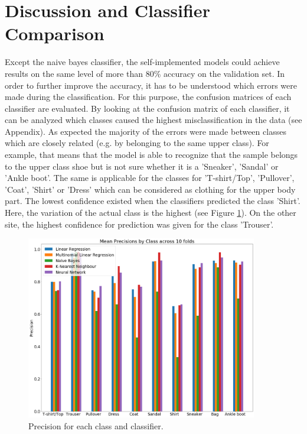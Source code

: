 \documentclass[11pt,a4paper]{article}
\begin{document}
\section*{Discussion and Classifier Comparison}
\noindent Except the naive bayes classifier, the self-implemented models could achieve results on the same level of more than 80\% accuracy on the validation set. In order to further improve the accuracy, it has to be understood which errors were made during the classification. For this purpose, the confusion matrices of each classifier are evaluated. By looking at the confusion matrix of each classifier, it can be analyzed which classes caused the highest misclassification in the data (see Appendix). As expected the majority of the errors were made between classes which are closely related (e.g. by belonging to the same upper class). For example, that means that the model is able to recognize that the sample belongs to the upper class shoe but is not sure whether it is a 'Sneaker', 'Sandal' or 'Ankle boot'. The same is applicable for the classes for 'T-shirt/Top', 'Pullover', 'Coat', 'Shirt' or 'Dress' which can be considered as clothing for the upper body part. The lowest confidence existed when the classifiers predicted the class 'Shirt'. Here, the variation of the actual class is the highest (see Figure \ref{fig:accuracy}). On the other site, the highest confidence for prediction was given for the class 'Trouser'.\\
\begin{figure}[H]
    \centering
    \includegraphics[width=0.9\textwidth]{img/precision_comparison.png}
    \caption{Precision for each class and classifier.}
    \label{fig:accuracy}
\end{figure}
\end{document}
